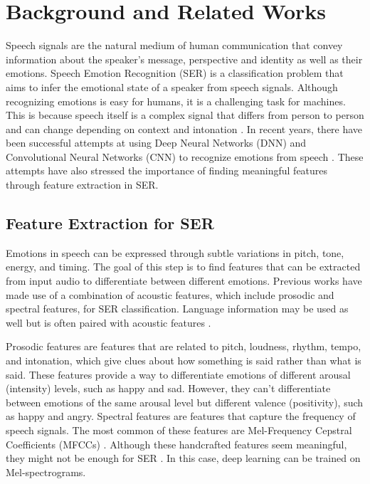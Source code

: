\documentclass[../main.tex]{subfiles}
\begin{document}
\section{Background and Related Works} 
Speech signals are the natural medium of 
human communication that convey information about the speaker's message, 
perspective and identity as well as their emotions. Speech Emotion Recognition 
(SER) is a classification problem that aims to infer the emotional state of a 
speaker from speech signals. Although recognizing emotions is easy for humans, 
it is a challenging task for machines. This is because speech itself is a 
complex signal that differs from person to person and can change depending on 
context and intonation \citep{Hashem2023} \citep{Koduru2020}. In recent years, there have been successful attempts at 
using Deep Neural Networks (DNN) and Convolutional Neural Networks (CNN) to 
recognize emotions from speech \citep{Pham2023} \cite{Zhang2018}. These attempts have also stressed the importance 
of finding meaningful features through feature extraction in SER.

\subsection{Feature Extraction for SER} 
Emotions in speech can be expressed 
through subtle variations in pitch, tone, energy, and timing. The goal of this 
step is to find features that can be extracted from input audio to differentiate 
between different emotions. Previous works have made use of a combination of 
acoustic features, which include prosodic and spectral features, for SER 
classification. Language information may be used as well but is often paired 
with acoustic features \citep{Pham2023} \cite{Zhang2018}. 

Prosodic features are features that are related to 
pitch, loudness, rhythm, tempo, and intonation, which give clues about how 
something is said rather than what is said. These features provide a way to 
differentiate emotions of different arousal (intensity) levels, such as happy 
and sad. However, they can't differentiate between emotions of the same arousal 
level but different valence (positivity), such as happy and angry. Spectral 
features are features that capture the frequency of speech signals. The most common 
of these features are Mel-Frequency Cepstral Coefficients (MFCCs) \citep{Hashem2023}. Although 
these handcrafted features seem meaningful, they might not be enough for SER \citep{Koduru2020}. 
In this case, deep learning can be trained on Mel-spectrograms.
\end{document}
